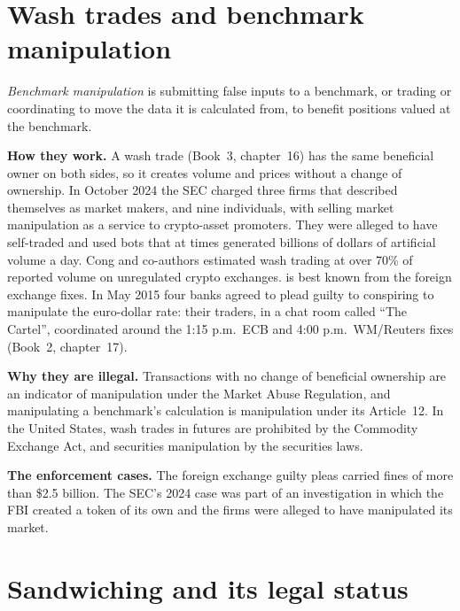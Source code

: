 \section{Wash trades and benchmark manipulation}

\begin{definition}\label{def:s2:manipulative-strategies-and-how-they-are-caught:benchmark}
\emph{Benchmark manipulation} is submitting false inputs to a benchmark, or trading or coordinating to move the data
it is calculated from, to benefit positions valued at the benchmark.
\end{definition}

\textbf{How they work.} A wash trade (Book~3, chapter~16) has the same beneficial owner on both sides, so it creates volume and prices without a change
of ownership. In October 2024 the SEC charged three firms that described themselves as market makers, and nine individuals, with selling market
manipulation as a service to crypto-asset promoters. They were alleged to have self-traded and used bots that at times generated billions of dollars of
artificial volume a day. Cong and co-authors estimated wash trading at over 70\% of reported volume on unregulated crypto exchanges.  is best known from the foreign exchange fixes. In May 2015 four banks agreed to plead guilty to conspiring to manipulate the euro-dollar
rate: their traders, in a chat room called ``The Cartel'', coordinated around the 1:15 p.m.\ ECB and 4:00 p.m.\ WM/Reuters fixes (Book~2,
chapter~17).

\textbf{Why they are illegal.} Transactions with no change of beneficial ownership are an indicator of manipulation under the Market Abuse Regulation,
and manipulating a benchmark's calculation is manipulation under its Article~12. In the United States, wash trades in futures are prohibited by the
Commodity Exchange Act, and securities manipulation by the securities laws.

\textbf{The enforcement cases.} The foreign exchange guilty pleas carried fines of more than \$2.5 billion. The SEC's 2024 case was part of an
investigation in which the FBI created a token of its own and the firms were alleged to have manipulated its market.

\section{Sandwiching and its legal status}

